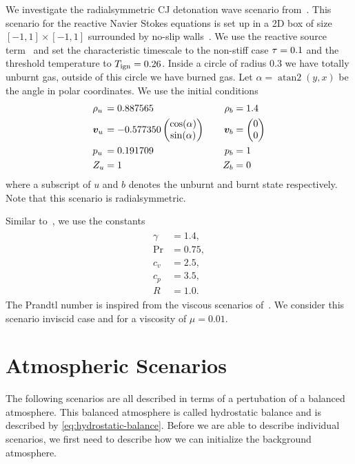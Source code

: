 We investigate the radialsymmetric CJ detonation wave scenario from~\cite{helzel2000modified}.
This scenario for the reactive Navier Stokes equations is set up in a 2D box of size $[-1, 1] \times [-1, 1]$ surrounded by no-slip walls~.
We use the reactive source term~ and set the characteristic timescale to the non-stiff case $\tau = 0.1$ and the threshold temperature to $T_{\text{ign}} = 0.26$.
Inside a circle of radius $0.3$ we have totally unburnt gas, outside of this circle we have burned gas.
Let $\alpha =  \operatorname{atan2}(y,x)$ be the angle in polar coordinates.
We use the initial conditions
\begin{equation}
\begin{alignedat}{6}
  & \rho_u &&= 0.887565 \qquad& \rho_b &= 1.4\\
  & \bm{v}_u &&= -0.577350
  \begin{pmatrix}
     \cos (\alpha)\\
     \sin (\alpha)
   \end{pmatrix}  \qquad& \bm{v}_b  &=
   \begin{pmatrix}
     0 \\
     0
   \end{pmatrix}\\
   & p_u &&=0.191709 \qquad& p_b &= 1\\
   & Z_u &&= 1 \quad& Z_b &= 0
  \end{alignedat}
\end{equation}
where a subscript of $u$ and $b$ denotes the unburnt and burnt state respectively.
Note that this scenario is radialsymmetric.

Similar to~\cite{helzel2000modified}, we use the constants
\begin{align}
  \begin{split}
  \gamma &= 1.4, \\
  \Pr &= 0.75, \\
  c_v &= 2.5, \\
  c_p &= 3.5, \\
  R &= 1.0.
  \end{split}
\end{align}
The Prandtl number is inspired from the viscous scenarios of~\cite{hidalgo2011ader}.
We consider this scenario inviscid case and for a viscosity of $\mu = 0.01$.


\section{Atmospheric Scenarios}
The following scenarios are all described in terms of a pertubation of a balanced atmosphere.
This balanced atmosphere is called hydrostatic balance and is described by \cref{eq:hydrostatic-balance}.
Before we are able to describe individual scenarios, we first need to describe how we can initialize the background atmosphere.

